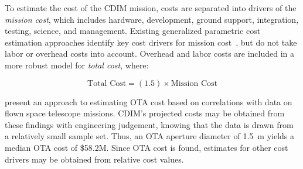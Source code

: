 \documentclass{ws-jai}
\begin{document}
To estimate the cost of the CDIM mission, costs are separated into drivers of the \emph{mission cost}, which includes hardware, development, ground support, integration, testing, science, and management.
Existing generalized parametric cost estimation approaches identify key cost drivers for mission cost~\cite{stahl2013,bely2011}, but do not take labor or overhead costs into account.
Overhead and labor costs are included in a more robust model for \emph{total cost}, where:

\begin{equation}
  	\text{Total Cost}=(1.5)\times\text{Mission Cost}
\label{eq:total-cost}
\end{equation}

\citeauthor{stahl2013} present an approach to estimating OTA cost based on correlations with data on flown space telescope missions.
CDIM's projected costs may be obtained from these findings with engineering judgement, knowing that the data is drawn from a relatively small sample set.
Thus, an OTA aperture diameter of \SI{1.5}{\meter} yields a median OTA cost of \$58.2M.
Since OTA cost is found, estimates for other cost drivers may be obtained from relative cost values.
\end{document}
